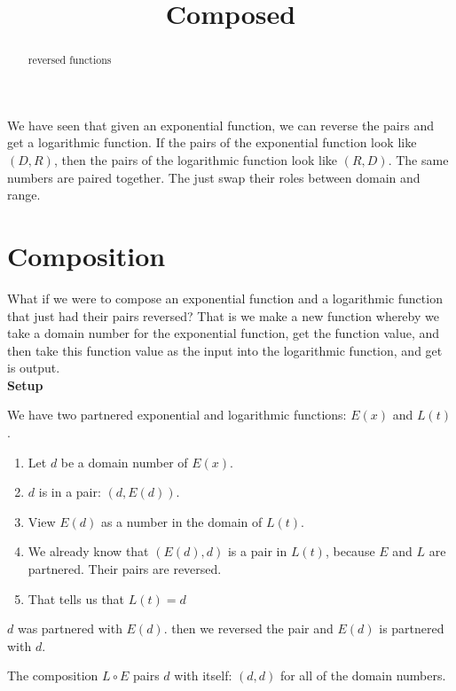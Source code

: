 \documentclass{ximera}
\title{Composed}
\begin{document}
\begin{abstract}
reversed functions
\end{abstract}
\maketitle







We have seen that given an exponential function, we can reverse the pairs and get a logarithmic function.  If the pairs of the exponential function look like $(D,R)$, then the pairs of the logarithmic function look like $(R,D)$.  The same numbers are paired together.  The just swap their roles between domain and range.

\section*{Composition}

What if we were to compose an exponential function and a logarithmic function that just had their pairs reversed?  That is we make a new function whereby we take a domain number for the exponential function, get the function value, and then take this function value as the input into the logarithmic function, and get is output. \\





\textbf{Setup}

We have two partnered exponential and logarithmic functions: $E(x)$ and $L(t)$.  \\

\begin{enumerate}
\item Let $d$ be a domain number of $E(x)$.
\item $d$ is in a pair: $(d, E(d))$.
\item View $E(d)$ as a number in the domain of $L(t)$.
\item We already know that $(E(d),d)$ is a pair in $L(t)$, because $E$ and $L$ are partnered.  Their pairs are reversed.
\item That tells us that $L(t)=d$
\end{enumerate}



$d$ was partnered with $E(d)$.  then we reversed the pair and $E(d)$ is partnered with $d$.

The composition $L \circ E$ pairs $d$ with itself: $(d,d)$ for all of the domain numbers. \\
\end{document}
